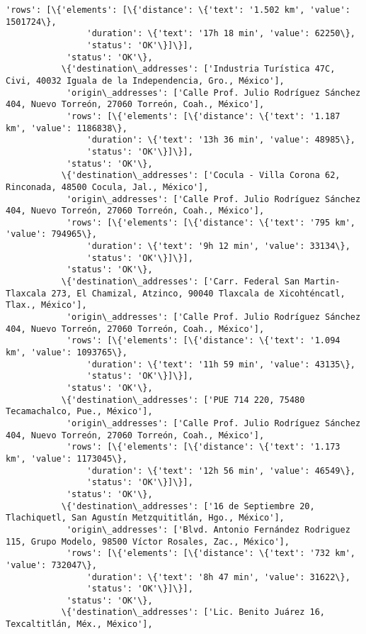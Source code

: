 \documentclass[11pt]{article}
\begin{document}
\begin{Verbatim}[commandchars=\\\{\}]
            'rows': [\{'elements': [\{'distance': \{'text': '1.502 km', 'value': 1501724\},
                'duration': \{'text': '17h 18 min', 'value': 62250\},
                'status': 'OK'\}]\}],
            'status': 'OK'\},
           \{'destination\_addresses': ['Industria Turística 47C, Civi, 40032 Iguala de la Independencia, Gro., México'],
            'origin\_addresses': ['Calle Prof. Julio Rodríguez Sánchez 404, Nuevo Torreón, 27060 Torreón, Coah., México'],
            'rows': [\{'elements': [\{'distance': \{'text': '1.187 km', 'value': 1186838\},
                'duration': \{'text': '13h 36 min', 'value': 48985\},
                'status': 'OK'\}]\}],
            'status': 'OK'\},
           \{'destination\_addresses': ['Cocula - Villa Corona 62, Rinconada, 48500 Cocula, Jal., México'],
            'origin\_addresses': ['Calle Prof. Julio Rodríguez Sánchez 404, Nuevo Torreón, 27060 Torreón, Coah., México'],
            'rows': [\{'elements': [\{'distance': \{'text': '795 km', 'value': 794965\},
                'duration': \{'text': '9h 12 min', 'value': 33134\},
                'status': 'OK'\}]\}],
            'status': 'OK'\},
           \{'destination\_addresses': ['Carr. Federal San Martin-Tlaxcala 273, El Chamizal, Atzinco, 90040 Tlaxcala de Xicohténcatl, Tlax., México'],
            'origin\_addresses': ['Calle Prof. Julio Rodríguez Sánchez 404, Nuevo Torreón, 27060 Torreón, Coah., México'],
            'rows': [\{'elements': [\{'distance': \{'text': '1.094 km', 'value': 1093765\},
                'duration': \{'text': '11h 59 min', 'value': 43135\},
                'status': 'OK'\}]\}],
            'status': 'OK'\},
           \{'destination\_addresses': ['PUE 714 220, 75480 Tecamachalco, Pue., México'],
            'origin\_addresses': ['Calle Prof. Julio Rodríguez Sánchez 404, Nuevo Torreón, 27060 Torreón, Coah., México'],
            'rows': [\{'elements': [\{'distance': \{'text': '1.173 km', 'value': 1173045\},
                'duration': \{'text': '12h 56 min', 'value': 46549\},
                'status': 'OK'\}]\}],
            'status': 'OK'\},
           \{'destination\_addresses': ['16 de Septiembre 20, Tlachiquetl, San Agustín Metzquititlán, Hgo., México'],
            'origin\_addresses': ['Blvd. Antonio Fernández Rodriguez 115, Grupo Modelo, 98500 Víctor Rosales, Zac., México'],
            'rows': [\{'elements': [\{'distance': \{'text': '732 km', 'value': 732047\},
                'duration': \{'text': '8h 47 min', 'value': 31622\},
                'status': 'OK'\}]\}],
            'status': 'OK'\},
           \{'destination\_addresses': ['Lic. Benito Juárez 16, Texcaltitlán, Méx., México'],

\end{Verbatim}
\end{document}
